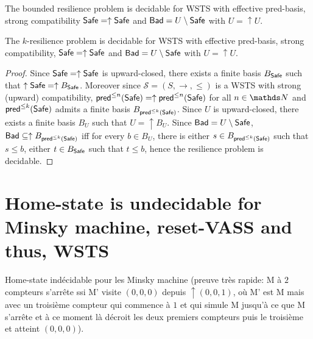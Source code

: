 \begin{corollary}\label{B-up-up}
The bounded resilience problem is decidable for WSTS with effective pred-basis,
strong compatibility
 $\textsf{Safe}=\uparrow \textsf{Safe}$
and $\textsf{Bad}=U \setminus \textsf{Safe}$ with $U = \uparrow U$.
\end{corollary}


\begin{theorem}\label{k-up-up}
The %
$k$-resilience problem is decidable for WSTS with effective pred-basis, strong %
compatibility, $\textsf{Safe}=\uparrow \textsf{Safe}$
and $\textsf{Bad}=U \setminus \textsf{Safe}$  with $U = \uparrow U$.
\end{theorem}

\begin{proof}
Since $\textsf{Safe}=\uparrow \textsf{Safe}$ is upward-closed, there exists a finite basis $B_{ \textsf{Safe}}$ such that $\uparrow \textsf{Safe} = \uparrow B_{\textsf{Safe}}$. 
Moreover since $\mathscr{S}=(S,\rightarrow,\leq)$ is a WSTS with strong (upward) compatibility,  $\textsf{pred}^{\leq n}(\textsf{Safe})=\uparrow \textsf{pred}^{\leq n}(\textsf{Safe})$ for all $n\in \N$ and $\textsf{pred}^{\leq k}(\textsf{Safe})$ admits a finite basis $B_{\textsf{pred}^{\leq k}(\textsf{Safe})}$. %
Since $U$  is upward-closed, there exists a finite basis $B_{U}$ such that $U = \uparrow B_{U}$. %
Since $\textsf{Bad} = U \setminus \textsf{Safe}$, $\textsf{Bad} \subseteq \uparrow B_{\textsf{pred}^{\leq k}(\textsf{Safe})}$ iff for every $b \in B_{U}$, there is either $s \in B_{\textsf{pred}^{\leq k}(\textsf{Safe})}$ such that $s \leq b$, either $t \in B_{\textsf{Safe}}$ such that $t\leq b$,
hence the resilience problem is decidable.
\end{proof}




\section{Home-state is undecidable for Minsky machine, reset-VASS and thus, WSTS}\label{HS-Minsk}

Home-state indécidable pour les Minsky machine (preuve très rapide: M à $2$ compteurs s'arrête ssi M' visite $(0,0,0)$ depuis $\uparrow(0,0,1)$, où M' est M mais avec un troisième compteur qui commence à $1$ et qui simule M jusqu'à ce que M s'arrête et à ce moment là décroit les deux premiers compteurs puis le troisième et atteint $(0,0,0)$).

